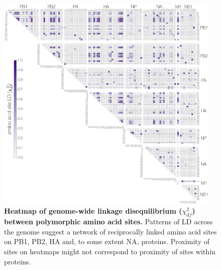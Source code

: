 \documentclass[11pt,oneside,letterpaper]{article}
\newcommand{\chiSq}{\chi^{2}_{df}}
\begin{document}
\begin{figure}
\centering  
\includegraphics[width=0.95\textwidth]  {supp_figures/InfB_LDheatmap.1600.aa.ChiSqdf.minorCutoff1percent.png}
\caption{\textbf{Heatmap of genome-wide linkage disequilibrium ($\chiSq$) between polymorphic amino acid sites.}
Patterns of LD across the genome suggest a network of reciprocally linked amino acid sites on PB1, PB2, HA and, to some extent NA, proteins.
Proximity of sites on heatmaps might not correspond to proximity of sites within proteins.}
\label{ChiGenome}
\end{figure}
\end{document}
